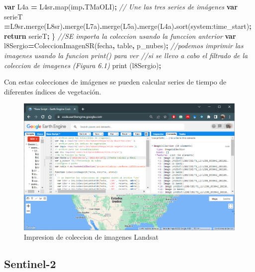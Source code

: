 \documentclass[
]{book}
\newenvironment{Shaded}{\begin{snugshade}}{\end{snugshade}}
\newcommand{\AttributeTok}[1]{\textcolor[rgb]{0.77,0.63,0.00}{#1}}
\newcommand{\CommentTok}[1]{\textcolor[rgb]{0.56,0.35,0.01}{\textit{#1}}}
\newcommand{\ControlFlowTok}[1]{\textcolor[rgb]{0.13,0.29,0.53}{\textbf{#1}}}
\newcommand{\FunctionTok}[1]{\textcolor[rgb]{0.00,0.00,0.00}{#1}}
\newcommand{\KeywordTok}[1]{\textcolor[rgb]{0.13,0.29,0.53}{\textbf{#1}}}
\newcommand{\NormalTok}[1]{#1}
\newcommand{\OperatorTok}[1]{\textcolor[rgb]{0.81,0.36,0.00}{\textbf{#1}}}
\newcommand{\StringTok}[1]{\textcolor[rgb]{0.31,0.60,0.02}{#1}}
\begin{document}
\begin{Shaded}
\begin{Highlighting}[]
  \KeywordTok{var}\NormalTok{ L4a }\OperatorTok{=}\NormalTok{ L4sr}\OperatorTok{.}\FunctionTok{map}\NormalTok{(imp}\OperatorTok{.}\AttributeTok{TMaOLI}\NormalTok{)}\OperatorTok{;}
  \CommentTok{// Une las tres series de imágenes}
  \KeywordTok{var}\NormalTok{ serieT }\OperatorTok{=}\NormalTok{L9sr}\OperatorTok{.}\FunctionTok{merge}\NormalTok{(L8sr)}\OperatorTok{.}\FunctionTok{merge}\NormalTok{(L7a)}\OperatorTok{.}\FunctionTok{merge}\NormalTok{(L5a)}\OperatorTok{.}\FunctionTok{merge}\NormalTok{(L4a)}\OperatorTok{.}\FunctionTok{sort}\NormalTok{(}\StringTok{\textquotesingle{}system:time\_start\textquotesingle{}}\NormalTok{)}\OperatorTok{;}
    \ControlFlowTok{return}\NormalTok{ serieT}\OperatorTok{;}
\NormalTok{\}}
\CommentTok{//SE importa la coleccion usando la funccion anterior }
\KeywordTok{var}\NormalTok{ l8Sergio}\OperatorTok{=}\FunctionTok{ColeccionImagenSR}\NormalTok{(fecha}\OperatorTok{,}\NormalTok{ table}\OperatorTok{,}\NormalTok{ p\_nubes)}\OperatorTok{;}
\CommentTok{//podemos imprimir las imagenes usando la funcion print() para ver }
\CommentTok{//si se llevo a cabo el filtrado de la coleccion de imagenes (Figura 6.1) }
\FunctionTok{print}\NormalTok{ (l8Sergio)}\OperatorTok{;}
\end{Highlighting}
\end{Shaded}

Con estas colecciones de imágenes se pueden calcular series de tiempo de diferentes índices de vegetación.

\begin{figure}

{\centering \includegraphics[width=0.85\linewidth]{./images/Figure70} 

}

\caption{Impresion de coleccion de imagenes Landsat}\label{fig:figV1}
\end{figure}

\hypertarget{sentinel-2}{%
\subsection{Sentinel-2}\label{sentinel-2}}
\end{document}
